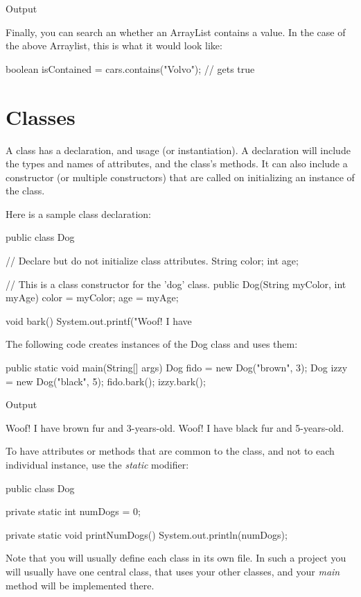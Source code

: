 Output
\begin{code}
\end{code}


Finally, you can search an whether an ArrayList contains a value. In the case of the above Arraylist, this is what it would look like:

\begin{code}
    boolean isContained = cars.contains("Volvo"); // gets true
\end{code}

\section{Classes}

A class has a declaration, and usage (or instantiation). A declaration will include the types and names of attributes, and the class's methods. It can also include a constructor (or multiple constructors) that are called on initializing an instance of the class.

Here is a sample class declaration:

\begin{code}
public class Dog {
    // Declare but do not initialize class attributes.
    String color;
    int age;
    
    // This is a class constructor for the 'dog' class.
    public Dog(String myColor, int myAge) {
    color = myColor;
    age = myAge;
    }
    
    void bark() {
    System.out.printf("Woof! I have %
    }
}
\end{code}


The following code creates instances of the Dog class and uses them:

\begin{code}
public static void main(String[] args) {
    Dog fido = new Dog("brown", 3);
    Dog izzy = new Dog("black", 5);
    fido.bark();
    izzy.bark();
}
\end{code}

Output
\begin{code}
Woof! I have brown fur and 3-years-old.
Woof! I have black fur and 5-years-old.
\end{code}

To have attributes or methods that are common to the class, and not to each individual instance, use the \textit{static} modifier:

\begin{code}
public class Dog {
    private static int numDogs = 0;
    
    private static void printNumDogs(){
        System.out.println(numDogs);
    }
}
\end{code}

Note that you will usually define each class in its own file. In such a project you will usually have one central class, that uses your other classes, and your \textit{main} method will be implemented there.

